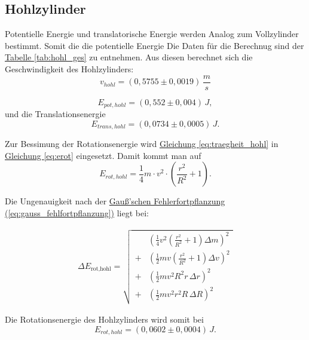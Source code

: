 \subsection*{Hohlzylinder}
Potentielle Energie und translatorische Energie werden Analog zum Vollzylinder bestimmt. Somit die die potentielle Energie
Die Daten für die Berechnug sind der \hyperref[tab:hohl_ges]{Tabelle \ref*{tab:hohl_ges}} zu entnehmen. Aus diesen berechnet sich die Geschwindigkeit des Hohlzylinders:
\begin{equation}
\boxed{
    v_{hohl} = (0,5755 \pm 0,0019) \, \frac{m}{s}
}
\end{equation}

\begin{equation}
\boxed{
    E_{pot,hohl} = (0,552 \pm 0,004) \, J
},
\end{equation}
und die Translationsenergie
\begin{equation}
\boxed{
    E_{trans,hohl} = (0,0734 \pm 0,0005) \, J
}.
\end{equation}

Zur Bessimung der Rotationsenergie wird \hyperref[eq:traegheit_hohl]{Gleichung \ref*{eq:traegheit_hohl}} in \hyperref[eq:erot]{Gleichung \ref*{eq:erot}} eingesetzt. Damit kommt man auf
\begin{equation}
    E_{rot,hohl} = \frac{1}{4} m \cdot v^2 \cdot \left(\frac{r^2}{R^2} + 1\right).
\end{equation}

Die Ungenauigkeit nach der \hyperref[eq:gauss_fehlfortpflanzung]{Gauß'schen Fehlerfortpflanzung (\ref*{eq:gauss_fehlfortpflanzung})} liegt bei:

\begin{align}
\Delta E_{\text{rot,hohl}}
= \sqrt{\begin{aligned}
   &\left( \tfrac{1}{4} v^{2}\left(\tfrac{r^{2}}{R^{2}}+1\right)\Delta m \right)^{2} \\
+  &\left( \tfrac{1}{2} m v \left(\tfrac{r^{2}}{R^{2}}+1\right)\Delta v \right)^{2} \\
+  &\left( \tfrac{1}{2} m v^{2} R^{2} r \,\Delta r \right)^{2} \\
+  &\left( \tfrac{1}{2} m v^{2} r^{2} R \,\Delta R \right)^{2}
\end{aligned}}
\end{align}


Die Rotationsenergie des Hohlzylinders wird somit bei 
\begin{equation}
\boxed{
    E_{rot,hohl} = (0,0602 \pm 0,0004) \, J
}.
\end{equation}


